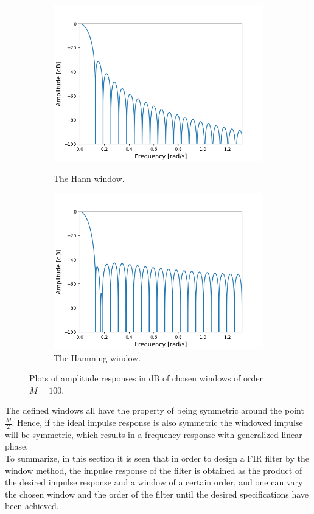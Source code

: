 \begin{figure}[H]
\begin{subfigure}{0.49\textwidth}
\includegraphics[width=\textwidth]{figures/dbplots/hann.png}
\caption{The Hann window.}
\label{fig:hann_db}
\includegraphics[width=\textwidth]{figures/dbplots/hamming.png}
\caption{The Hamming window.}
\label{fig:hamming_db}
\end{subfigure}
\caption{Plots of amplitude responses in dB of chosen windows of order $M=100$.}
\label{fig:windows}
\end{figure}

The defined windows all have the property of being symmetric around the point $\frac{M}{2}$. Hence, if the ideal impulse response is also symmetric the windowed impulse will be symmetric, which results in a frequency response with generalized linear phase. \\
To summarize, in this section it is seen that in order to design a FIR filter by the window method, the impulse response of the filter is obtained as the product of the desired impulse response and a window of a certain order, and one can vary the chosen window and the order of the filter until the desired specifications have been achieved.

